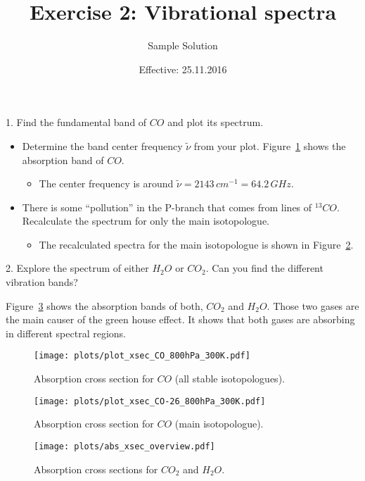 \documentclass[paper=a4, fontsize=11pt]{scrartcl} %
\title{Exercise 2: Vibrational spectra}
\author{Sample Solution}
\date{Effective: 25.11.2016}
\begin{document}
\maketitle

1. Find the fundamental band of $CO$ and plot its spectrum.
\begin{itemize}
  \item Determine the band center frequency $\tilde{\nu}$ from your plot.
    Figure~\ref{fig:abs_xsec_CO} shows the absorption band of $CO$.
    \begin{itemize}
      \item The center frequency is around $\tilde{\nu} = 2143\,cm^{-1} = 64.2\,GHz$.
    \end{itemize}

  \item There is some “pollution” in the P-branch that comes from lines of $^{13}CO$.
    Recalculate the spectrum for only the main isotopologue.
    \begin{itemize}
      \item The recalculated spectra for the main isotopologue is shown in
        Figure~\ref{fig:abs_xsec_CO_main}.
    \end{itemize}
\end{itemize}

2. Explore the spectrum of either $H_2O$ or $CO_2$. Can you find the different
vibration bands?

Figure~\ref{fig:abs_xsec_overview} shows the absorption bands of both, $CO_2$
and $H_2O$. Those two gases are the main causer of the green house effect. It
shows that both gases are absorbing in different spectral regions.

\clearpage
\begin{figure}[h!]
  \centering
  \texttt{[image: plots/plot\_xsec\_CO\_800hPa\_300K.pdf]}
  \caption{Absorption cross section for $CO$ (all stable isotopologues).}
  \label{fig:abs_xsec_CO}
\end{figure}
\vfill
\begin{figure}[h!]
  \centering
  \texttt{[image: plots/plot\_xsec\_CO-26\_800hPa\_300K.pdf]}
  \caption{Absorption cross section for $CO$ (main isotopologue).}
  \label{fig:abs_xsec_CO_main}
\end{figure}

\begin{figure}[ht]
  \texttt{[image: plots/abs\_xsec\_overview.pdf]}
  \caption{Absorption cross sections for $CO_2$ and $H_2O$.}
  \label{fig:abs_xsec_overview}
\end{figure}
\end{document}
